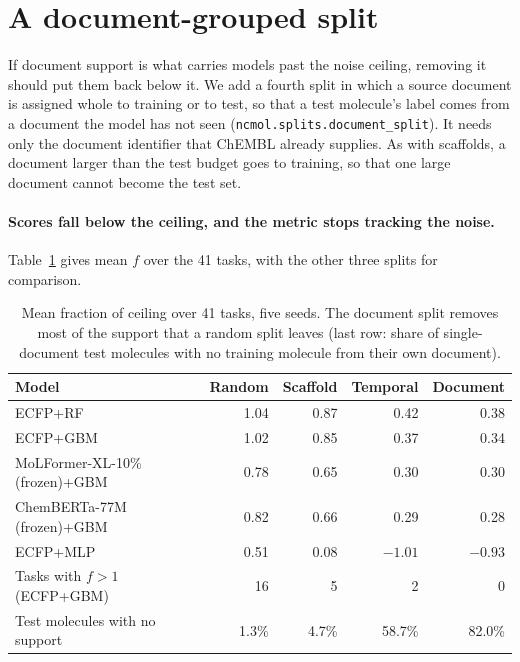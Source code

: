 \section{A document-grouped split}\label{sec:docsplit}

If document support is what carries models past the noise ceiling, removing it should put them back below it. We add a fourth split in which a source document is assigned whole to training or to test, so that a test molecule's label comes from a document the model has not seen (\texttt{ncmol.splits.}\allowbreak\texttt{document\_split}). It needs only the document identifier that ChEMBL already supplies. As with scaffolds, a document larger than the test budget goes to training, so that one large document cannot become the test set.

\paragraph{Scores fall below the ceiling, and the metric stops tracking the noise.} Table~\ref{tab:docsplit} gives mean $f$ over the 41 tasks, with the other three splits for comparison.

\begin{table}[t]
\centering\small
\caption{Mean fraction of ceiling over 41 tasks, five seeds. The document split removes most of the support that a random split leaves (last row: share of single-document test molecules with no training molecule from their own document).}
\label{tab:docsplit}
\begin{tabular}{lrrrr}
\toprule
Model & Random & Scaffold & Temporal & Document \\
\midrule
ECFP+RF                       & 1.04 & 0.87 & 0.42 & 0.38 \\
ECFP+GBM                      & 1.02 & 0.85 & 0.37 & 0.34 \\
MoLFormer-XL-10\% (frozen)+GBM & 0.78 & 0.65 & 0.30 & 0.30 \\
ChemBERTa-77M (frozen)+GBM    & 0.82 & 0.66 & 0.29 & 0.28 \\
ECFP+MLP                      & 0.51 & 0.08 & $-1.01$ & $-0.93$ \\
\midrule
Tasks with $f>1$ (ECFP+GBM)   & 16 & 5 & 2 & 0 \\
Test molecules with no support & 1.3\% & 4.7\% & 58.7\% & 82.0\% \\
\bottomrule
\end{tabular}
\end{table}

